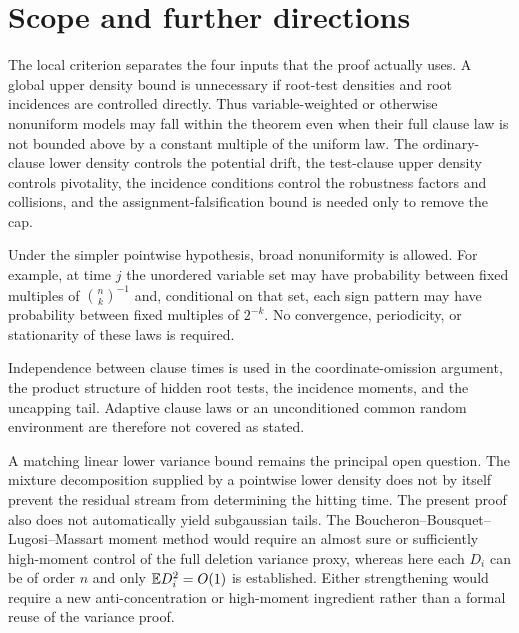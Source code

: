 \section{Scope and further directions}
\label{sec:scope}

The local criterion separates the four inputs that the proof actually uses.
A global upper density bound is unnecessary if root-test densities and root
incidences are controlled directly.  Thus variable-weighted or otherwise
nonuniform models may fall within the theorem even when their full clause
law is not bounded above by a constant multiple of the uniform law.  The
ordinary-clause lower density controls the potential drift, the test-clause
upper density controls pivotality, the incidence conditions control the
robustness factors and collisions, and the assignment-falsification bound is
needed only to remove the cap.

Under the simpler pointwise hypothesis, broad nonuniformity is allowed.  For
example, at time $j$ the unordered variable set may have probability between
fixed multiples of $\binom nk^{-1}$ and, conditional on that set, each sign
pattern may have probability between fixed multiples of $2^{-k}$.  No
convergence, periodicity, or stationarity of these laws is required.

Independence between clause times is used in the coordinate-omission
argument, the product structure of hidden root tests, the incidence moments,
and the uncapping tail.  Adaptive clause laws or an unconditioned common
random environment are therefore not covered as stated.

A matching linear lower variance bound remains the principal open question.
The mixture decomposition supplied by a pointwise lower density does not by
itself prevent the residual stream from determining the hitting time.  The
present proof also does not automatically yield subgaussian tails.  The
Boucheron--Bousquet--Lugosi--Massart moment method would require an almost
sure or sufficiently high-moment control of the full deletion variance
proxy, whereas here each $D_i$ can be of order $n$ and only
$\mathbb E D_i^2=O(1)$ is established.  Either strengthening would require a new
anti-concentration or high-moment ingredient rather than a formal reuse of
the variance proof.

\begingroup
\small


\endgroup
